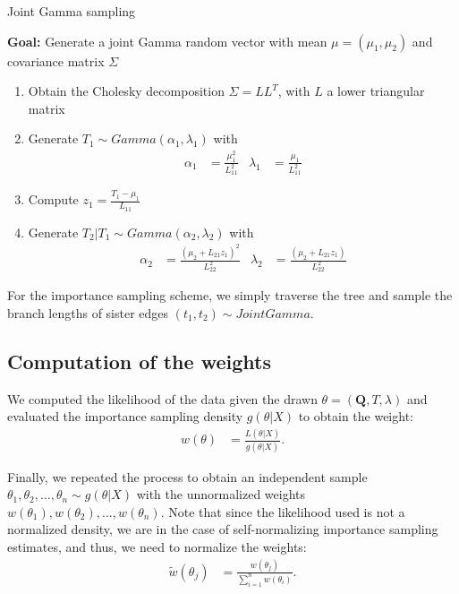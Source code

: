 \documentclass[conference]{IEEEtran}
\begin{document}
\begin{algorithm}
\caption{Joint Gamma sampling}
\textbf{Goal:} Generate a joint Gamma random vector with mean $\mu=(\mu_1, \mu_2)$
and covariance matrix $\Sigma$
\begin{enumerate}
\item{Obtain the Cholesky decomposition $\Sigma=LL^T$, with $L$ a
    lower triangular matrix}
\item{Generate $T_1 \sim Gamma(\alpha_1, \lambda_1)$ with 
\begin{align*}
\alpha_1 &= \frac{\mu_1^2}{L_{11}^2} & \lambda_1 &= \frac{\mu_1}{L_{11}^2}
\end{align*}}
\item{Compute $z_1 = \frac{T_1-\mu_1}{L_{11}}$}
\vspace{0.25cm}
\item{Generate $T_2|T_1 \sim Gamma(\alpha_2, \lambda_2)$ with
\begin{align*}
\alpha_2 &= \frac{(\mu_2+L_{21}z_1)^2}{L_{22}^2} & \lambda_2 &= \frac{(\mu_2+L_{21}z_1)}{L_{22}^2}
\end{align*}}
\end{enumerate}
\end{algorithm}

For the importance sampling scheme, we simply traverse the tree and
sample the branch lengths of sister edges $(t_1,t_2) \sim Joint Gamma$.

\subsection*{Computation of the weights}
We computed the likelihood of the data given the drawn $\theta = (\mathbf{Q}, T,
\lambda)$ and evaluated the importance sampling density $g(\theta|X)$
to obtain the weight:
\begin{align*}
w(\theta) &= \frac{L(\theta|X)}{g(\theta|X)}.
\end{align*}

Finally, we repeated the process to obtain an independent sample
$\theta_1, \theta_2,...,\theta_n \sim g(\theta|X)$ with the
unnormalized weights $w(\theta_1), w(\theta_2),...,w(\theta_n)$. Note
that since the likelihood used is not a normalized density, we are in
the case of self-normalizing importance sampling estimates, and thus,
we need to normalize the weights:
\begin{align*}
\tilde{w}(\theta_j) &= \frac{w(\theta_j)}{\sum_{i=1}^n w(\theta_i)}.
\end{align*}
\end{document}
